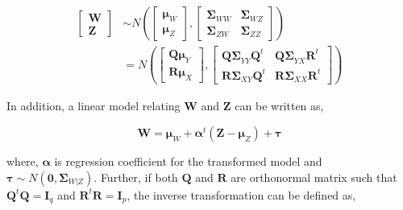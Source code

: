 \documentclass[12pt,A4paper,authoryear]{elsarticle} %
\begin{document}
\begin{align}
  \begin{bmatrix}\mathbf{W} \\ 
  \boldsymbol{Z}\end{bmatrix}  & \sim N \left(
    \begin{bmatrix}
      \boldsymbol{\mu}_W \\ \boldsymbol{\mu}_Z
    \end{bmatrix},
    \begin{bmatrix}
      \boldsymbol{\Sigma}_{WW} & \boldsymbol{\Sigma}_{WZ} \\
      \boldsymbol{\Sigma}_{ZW} & \boldsymbol{\Sigma}_{ZZ}
    \end{bmatrix} \right) \nonumber \\
  & = N \left(
    \begin{bmatrix}
      \boldsymbol{Q\mu}_Y \\
      \boldsymbol{R\mu}_X
    \end{bmatrix},
    \begin{bmatrix}
      \boldsymbol{Q\Sigma}_{YY}\boldsymbol{Q}^t & \boldsymbol{Q\Sigma}_{YX}\mathbf{R}^t \\
      \boldsymbol{R\Sigma}_{XY}\boldsymbol{Q}^t & \boldsymbol{R\Sigma}_{XX}\mathbf{R}^t
    \end{bmatrix}
  \right)
  \label{eq:model3}
\end{align}

In addition, a linear model relating \(\mathbf{W}\) and \(\mathbf{Z}\)
can be written as,

\begin{equation}
\mathbf{W} =    \boldsymbol{\mu}_W + \boldsymbol{\alpha}^t \left(\mathbf{Z} - \boldsymbol{\mu}_Z\right) + \boldsymbol{\tau}
\label{eq:latent-model}
\end{equation}

where, \(\boldsymbol{\alpha}\) is regression coefficient for the
transformed model and
\(\boldsymbol{\tau} \sim N\left(\mathbf{0}, \boldsymbol{\Sigma}_{W|Z}\right)\).
Further, if both \(\mathbf{Q}\) and \(\mathbf{R}\) are orthonormal
matrix such that \(\mathbf{Q}^t\mathbf{Q} = \mathbf{I}_q\) and
\(\mathbf{R}^t\mathbf{R} = \mathbf{I}_p\), the inverse transformation
can be defined as,
\end{document}
